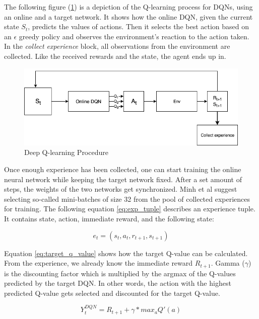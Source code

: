 \documentclass[12pt,a4paper]{article}
\begin{document}
The following figure (\ref{fig:dql_procedure}) is a depiction of the Q-learning process for DQNs, using an online and a target network. It shows how the online DQN, given the current state $S_t$, predicts the values of actions. Then it selects the best action based on an $\epsilon$ greedy policy and observes the environment's reaction to the action taken. In the {\it collect experience} block, all observations from the environment are collected. Like the received rewards and the state, the agent ends up in.

\begin{figure}
    \centering
    \includegraphics[width=0.8\linewidth]{Figures/QLearningProcedure.png}
    \caption{Deep Q-learning Procedure}
    \label{fig:dql_procedure}
\end{figure}
Once enough experience has been collected, one can start training the online neural network while keeping the target network fixed. After a set amount of steps, the weights of the two networks get synchronized. Minh et al \cite{Mnih2016} suggest selecting so-called mini-batches of size 32 from the pool of collected experiences for training. The following equation \ref{eq:exp_tuple} describes an experience tuple. It contains state, action, immediate reward, and the following state:

\begin{equation}
    \label{eq:exp_tuple}
    e_t = (s_t, a_t, r_{t+1}, s_{t+1})
\end{equation}

Equation \ref{eq:target_q_value} shows how the target Q-value can be calculated. From the experience, we already know the immediate reward $R_{t+1}$. Gamma ($\gamma$) is the discounting factor which is multiplied by the argmax of the Q-values predicted by the target DQN. In other words, the action with the highest predicted Q-value gets selected and discounted for the target Q-value.

\begin{equation}
    \label{eq:target_q_value}
    Y_t^{DQN} = R_{t+1} + \gamma * max_aQ'(a)
\end{equation}
\end{document}
